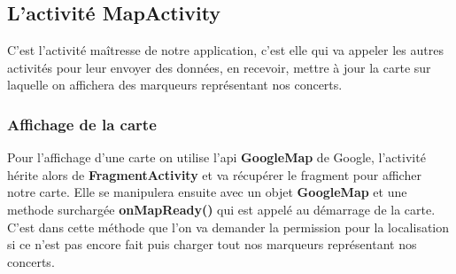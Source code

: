 \documentclass{article}
\begin{document}
\subsection{L'activité MapActivity}

C'est l'activité maîtresse de notre application, c'est elle qui va appeler les autres activités pour leur envoyer des données, en recevoir, mettre à jour la carte sur laquelle on affichera des marqueurs représentant nos concerts. 

\subsubsection{Affichage de la carte}

Pour l'affichage d'une carte on utilise l'api \textbf{GoogleMap} de Google, l'activité hérite alors de \textbf{FragmentActivity} et va récupérer le fragment pour afficher notre carte. Elle se manipulera ensuite avec un objet \textbf{GoogleMap} et une methode surchargée \textbf{onMapReady()} qui est appelé au démarrage de la carte. 
C'est dans cette méthode que l'on va demander la permission pour la localisation si ce n'est pas encore fait puis  charger tout nos marqueurs représentant nos concerts. 
\end{document}

